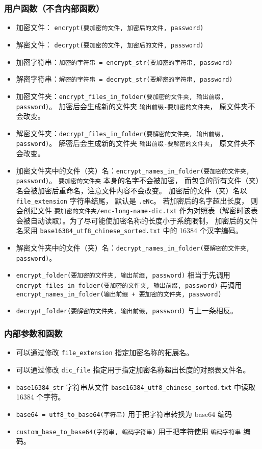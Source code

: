 \subsubsection{用户函数（不含内部函数）}
\begin{itemize}
\item 加密文件： \verb`encrypt(要加密的文件, 加密后的文件, password)`
\item 解密文件： \verb`decrypt(要加密的文件, 加密后的文件, password)`
\item 加密字符串：\verb`加密的字符串 = encrypt_str(要加密的字符串, password)`
\item 解密字符串：\verb`解密的字符串 = decrypt_str(要解密的字符串, password)`
\item 加密文件夹：\verb`encrypt_files_in_folder(要加密的文件夹, 输出前缀, password)`。 加密后会生成新的文件夹 \verb`输出前缀-要加密的文件夹`， 原文件夹不会改变。
\item 解密文件夹：\verb`decrypt_files_in_folder(要解密的文件夹, 输出前缀, password)`。 解密后会生成新的文件夹 \verb`输出前缀-要解密的文件夹`， 原文件夹不会改变。
\item 加密文件夹中的文件（夹）名：\verb`encrypt_names_in_folder(要加密的文件夹, password)`。 \verb`要加密的文件夹` 本身的名字不会被加密， 而包含的所有文件（夹）名会被加密后重命名，注意文件内容不会改变。 加密后的文件（夹）名以 \verb`file_extension` 字符串结尾， 默认是 \verb`.eNc`。 若加密后的名字超出长度， 则会创建文件 \verb`要加密的文件夹/enc-long-name-dic.txt` 作为对照表（解密时该表会被自动读取）。为了尽可能使加密名称的长度小于系统限制， 加密后的文件名采用 \verb`base16384_utf8_chinese_sorted.txt` 中的 16384 个汉字编码。
\item 解密文件夹中的文件（夹）名：\verb`decrypt_names_in_folder(要解密的文件夹, password)`。
\item \verb`encrypt_folder(要加密的文件夹, 输出前缀, password)` 相当于先调用 \verb`encrypt_files_in_folder(要加密的文件夹, 输出前缀, password)` 再调用 \verb`encrypt_names_in_folder(输出前缀 + 要加密的文件夹, password)`
\item \verb`decrypt_folder(要解密的文件夹, 输出前缀, password)` 与上一条相反。
\end{itemize}

\subsubsection{内部参数和函数}
\begin{itemize}
\item 可以通过修改 \verb`file_extension` 指定加密名称的拓展名。
\item 可以通过修改 \verb`dic_file` 指定用于指定加密名称超出长度的对照表文件名。
\item \verb`base16384_str` 字符串从文件 \verb`base16384_utf8_chinese_sorted.txt` 中读取 16384 个字符。
\item \verb`base64 = utf8_to_base64(字符串)` 用于把字符串转换为 base64 编码
\item \verb`custom_base_to_base64(字符串, 编码字符串)` 用于把字符使用 \verb`编码字符串` 编码。
\end{itemize}
